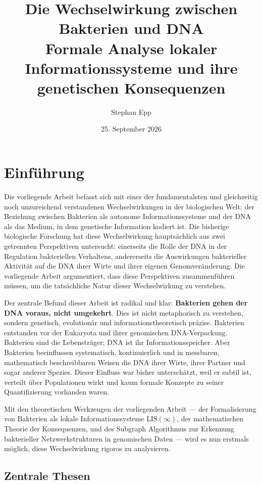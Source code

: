 \documentclass[a4paper,12pt]{article}
\title{\textbf{Die Wechselwirkung zwischen\\ Bakterien und DNA}\\Formale Analyse lokaler Informationssysteme und ihre genetischen Konsequenzen}
\author{Stephan Epp}
\date{25. September 2026}
\theoremstyle{definition}
\begin{document}
\maketitle
\tableofcontents
\newpage

\section{Einführung}

Die vorliegende Arbeit befasst sich mit einer der fundamentalsten und gleichzeitig noch unzureichend verstandenen Wechselwirkungen in der biologischen Welt: der Beziehung zwischen Bakterien als autonome Informationssysteme und der DNA als das Medium, in dem genetische Information kodiert ist. Die bisherige biologische Forschung hat diese Wechselwirkung hauptsächlich aus zwei getrennten Perspektiven untersucht: einerseits die Rolle der DNA in der Regulation bakteriellen Verhaltens, andererseits die Auswirkungen bakterieller Aktivität auf die DNA ihrer Wirte und ihrer eigenen Genomveränderung. Die vorliegende Arbeit argumentiert, dass diese Perspektiven zusammenführen müssen, um die tatsächliche Natur dieser Wechselwirkung zu verstehen.

Der zentrale Befund dieser Arbeit ist radikal und klar: \textbf{Bakterien gehen der DNA voraus, nicht umgekehrt}. Dies ist nicht metaphorisch zu verstehen, sondern genetisch, evolutionär und informationstheoretisch präzise. Bakterien entstanden vor der Eukaryota und ihrer genomischen DNA-Verpackung. Bakterien sind die Lebensträger; DNA ist ihr Informationsspeicher. Aber Bakterien beeinflussen systematisch, kontinuierlich und in messbaren, mathematisch beschreibbaren Weisen die DNA ihrer Wirte, ihrer Partner und sogar anderer Spezies. Dieser Einfluss war bisher unterschätzt, weil er subtil ist, verteilt über Populationen wirkt und kaum formale Konzepte zu seiner Quantifizierung vorhanden waren.

Mit den theoretischen Werkzeugen der vorliegenden Arbeit --- der Formalisierung von Bakterien als lokale Informationssysteme $\text{LIS}(\infty)$, der mathematischen Theorie der Konsequenzen, und des Subgraph Algorithmus zur Erkennung bakterieller Netzwerkstrukturen in genomischen Daten --- wird es nun erstmals möglich, diese Wechselwirkung rigoros zu analysieren.

\subsection{Zentrale Thesen}
\end{document}

